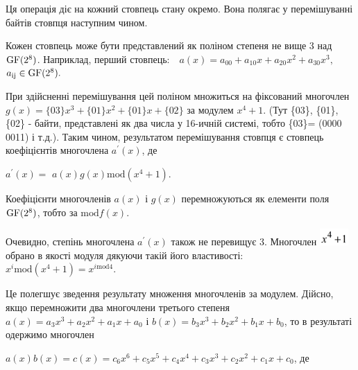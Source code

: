 \documentclass[a4paper]{article}
\newcounter{}
\newcommand\normalsubformula[1]{\text{\mathversion{normal}$#1$}}
\begin{document}
\bigskip

Ця операція діє на кожний стовпець стану окремо. Вона полягає у перемішуванні
байтів стовпця наступним чином.

Кожен стовпець може бути представлений як поліном степеня не вище 3 над 
${\normalsubformula{\text{GF}}(2^{{8}})}$. Наприклад, перший стовпець:\ \ 
${a(x)=a_{{\text{00}}}+a_{{\text{10}}}x+a_{{\text{20}}}x^{{2}}+a_{{\text{30}}}x^{{3}},}$
 ${a_{{\normalsubformula{\text{ij}}}}\in
\normalsubformula{\text{GF}}(2^{{8}})\text{.}}$  


\bigskip

При  здійсненні перемішування цей поліном множиться на фіксований многочлен 
${g(x)=\{\text{03}\}x^{{3}}+\{\text{01}\}x^{{2}}+\{\text{01}\}x+\{\text{02}\}}$
за модулем  ${x^{{4}}+1}$. (Тут \{03\}, \{01\}, \{02\} -  байти, представлені
як два числа у 16-ичній системі, тобто \{03\}= (0000 0011) і т.д.). Таким
чином, результатом перемішування стовпця є стовпець коефіцієнтів многочлена 
${{a}^{'}(x)}$, де

\begin{figure}
\centering
\begin{minipage}{1.4965in}
{\centering   [Warning: Image ignored] %
 \par}
\end{minipage}
\end{figure}
{\centering
 ${{a}^{'}(x)=}$ ${a(x)g(x)\text{mod}(x^{{4}}+1)}$.
\par}

Коефіцієнти многочленів  ${a(x)}$ і  ${g(x)}$ перемножуються як елементи поля 
${\normalsubformula{\text{GF}}(2^{{8}})}$, тобто за  ${\text{mod}f(x)}$.

Очевидно, степінь многочлена  ${{a}^{'}(x)}$ також не перевищує 3. Многочлен 
\includegraphics[width=0.4307in,height=0.25in]{crypt-img/crypt-img334.png} 
обрано в якості модуля дякуючи такій його властивості: 
${x^{{i}}\text{mod}(x^{{4}}+1)=x^{{i\text{mod}4}}\text{.}}$

Це полегшує зведення результату множення многочленів за модулем. Дійсно, якщо
перемножити два многочлени третього степеня 
${a(x)=a_{{3}}x^{{3}}+a_{{2}}x^{{2}}+a_{{1}}x+a_{{0}}}$ і 
${b(x)=b_{{3}}x^{{3}}+b_{{2}}x^{{2}}+b_{{1}}x+b_{{0}}}$, то в результаті
одержимо многочлен 


${a(x)b(x)=c(x)=c_{{6}}x^{{6}}+c_{{5}}x^{{5}}+c_{{4}}x^{{4}}+c_{{3}}x^{{3}}+c_{{2}}x^{{2}}+c_{{1}}x+c_{{0}}}$,
де 
\end{document}
